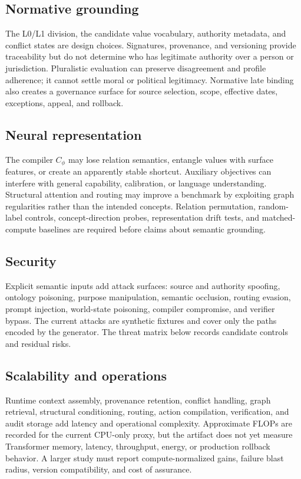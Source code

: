 \subsection{Normative grounding}

The L0/L1 division, the candidate value vocabulary, authority metadata, and conflict states are design choices. Signatures, provenance, and versioning provide traceability but do not determine who has legitimate authority over a person or jurisdiction. Pluralistic evaluation can preserve disagreement and profile adherence; it cannot settle moral or political legitimacy. Normative late binding also creates a governance surface for source selection, scope, effective dates, exceptions, appeal, and rollback.

\subsection{Neural representation}

The compiler $C_\phi$ may lose relation semantics, entangle values with surface features, or create an apparently stable shortcut. Auxiliary objectives can interfere with general capability, calibration, or language understanding. Structural attention and routing may improve a benchmark by exploiting graph regularities rather than the intended concepts. Relation permutation, random-label controls, concept-direction probes, representation drift tests, and matched-compute baselines are required before claims about semantic grounding.

\subsection{Security}

Explicit semantic inputs add attack surfaces: source and authority spoofing, ontology poisoning, purpose manipulation, semantic occlusion, routing evasion, prompt injection, world-state poisoning, compiler compromise, and verifier bypass. The current attacks are synthetic fixtures and cover only the paths encoded by the generator. The threat matrix below records candidate controls and residual risks.



\subsection{Scalability and operations}

Runtime context assembly, provenance retention, conflict handling, graph retrieval, structural conditioning, routing, action compilation, verification, and audit storage add latency and operational complexity. Approximate FLOPs are recorded for the current CPU-only proxy, but the artifact does not yet measure Transformer memory, latency, throughput, energy, or production rollback behavior. A larger study must report compute-normalized gains, failure blast radius, version compatibility, and cost of assurance.
